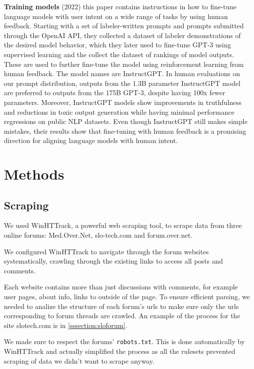\documentclass[fleqn,moreauthors,10pt]{ds_report}
\begin{document}
\noindent
\textbf{Training models} (2022) \cite{Ouyang2022TrainingLM} this paper contains instructions in how to fine-tune language models with user intent on a wide range of tasks by using human feedback.
Starting with a set of labeler-written prompts and prompts
submitted through the OpenAI API, they collected a dataset of labeler demonstrations
of the desired model behavior, which they later used to fine-tune GPT-3 using supervised
learning and the collect the dataset of rankings of model outputs. These are used to further fine-tune the model using reinforcement learning from human feedback. The model names are InstructGPT. In human evaluations on
our prompt distribution, outputs from the 1.3B parameter InstructGPT model are
preferred to outputs from the 175B GPT-3, despite having 100x fewer parameters.
Moreover, InstructGPT models show improvements in truthfulness and reductions
in toxic output generation while having minimal performance regressions on public
NLP datasets. Even though InstructGPT still makes simple mistakes, their results
show that fine-tuning with human feedback is a promising direction for aligning
language models with human intent.


\section*{Methods}

\subsection*{Scraping}

We used WinHTTrack, a powerful web scraping tool, to scrape data from three online forums: Med.Over.Net, slo-tech.com and forum.over.net.

We configured WinHTTrack to navigate through the forum websites systematically, crawling through the existing links to access all posts and comments.

Each website contains more than just discussions with comments, for example user pages, about info, links to outside of the page. To ensure efficient parsing, we needed to analize the structure of each forum's urls to make sure only the urls corresponding to forum threads are crawled. An example of the process for the site slotech.com is in \ref{sssection:sloforum}.

We made sure to respect the forums' \texttt{robots.txt}. This is done automatically by WinHTTrack and actually simplified the process as all the rulesets prevented scraping of data we didn't want to scrape anyway.
\end{document}
